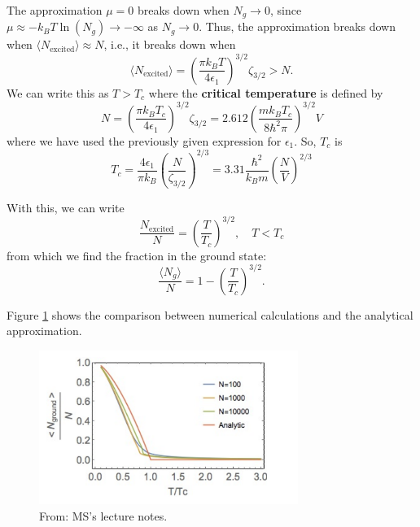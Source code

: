 \documentclass{book}
\theoremstyle{definition}
\newcommand{\f}[2]{\frac{#1}{#2}}
\newcommand{\lp}{\left(}
\newcommand{\rp}{\right)}
\begin{document}
The approximation $\mu=0$ breaks down when $N_g \to 0$, since $\mu \approx -k_B T \ln (N_g)\to -\infty$ as $N_g \to 0$. Thus, the approximation breaks down when $\langle N_{\text{excited}}\rangle \approx N$, i.e., it breaks down when 
\begin{equation*}
\langle N_{\text{excited}} \rangle =\lp \f{\pi k_B T}{4\epsilon_1} \rp^{3/2} \zeta_{3/2} > N.
\end{equation*} 
We can write this as $T>T_c$ where the \textbf{critical temperature} is defined by 
\begin{equation*}
{N = \lp \f{\pi k_B T_c}{4\epsilon_1} \rp^{3/2} \zeta_{3/2} = 2.612 \lp \f{mk_B T_c}{8\hbar^2 \pi} \rp^{3/2} V}
\end{equation*}
where we have used the previously given expression for $\epsilon_1$. So, $T_c$ is 
\begin{equation*}
\boxed{T_c = \f{4\epsilon_1}{\pi k_B} \lp \f{N}{\zeta_{3/2}} \rp^{2/3} = 3.31 \f{\hbar^2}{k_B m} \lp \f{N}{V} \rp^{2/3}  }
\end{equation*}


With this, we can write
\begin{equation*}
\f{N_\text{excited}}{N} = \lp \f{T}{T_c} \rp^{3/2}, \quad T < T_c
\end{equation*}
from which we find the fraction in the ground state: 
\begin{equation*}
\f{\langle N_g \rangle}{N} = 1-  \lp \f{T}{T_c} \rp^{3/2}.
\end{equation*}

Figure \ref{fig:4} shows the comparison between numerical calculations and the analytical approximation.

\begin{figure}[!htb]
	\centering
	\includegraphics[width=0.75\textwidth]{images/BEC_4}
	\caption{From: MS's lecture notes.}
	\label{fig:4}
\end{figure}
\end{document}
